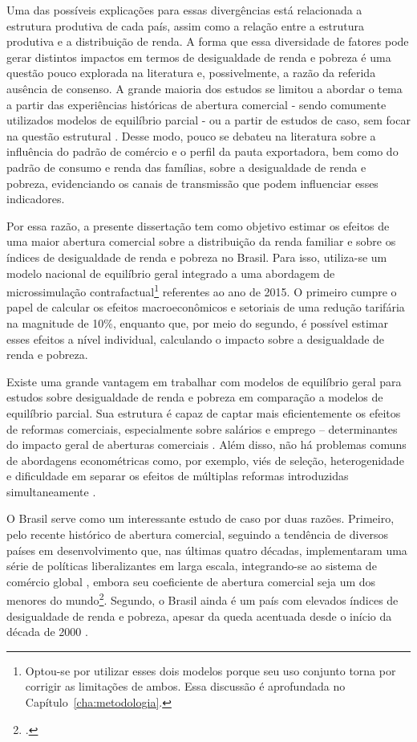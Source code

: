 Uma das possíveis explicações para essas divergências está relacionada a estrutura produtiva de cada país, assim como a relação entre a estrutura produtiva e a distribuição de renda. A forma que essa diversidade de fatores pode gerar distintos impactos em termos de desigualdade de renda e pobreza é uma questão pouco explorada na literatura e, possivelmente, a razão da referida ausência de consenso. A grande maioria dos estudos se limitou a abordar o tema a partir das experiências históricas de abertura comercial - sendo comumente utilizados modelos de equilíbrio parcial \cite{castilho12, bayar17} - ou a partir de estudos de caso, sem focar na questão estrutural \cite{borrazetal12, estrades12, campostimini22}. Desse modo, pouco se debateu na literatura sobre a influência do padrão de comércio e o perfil da pauta exportadora, bem como do padrão de consumo e renda das famílias, sobre a desigualdade de renda e pobreza, evidenciando os canais de transmissão que podem influenciar esses indicadores. 

Por essa razão, a presente dissertação tem como objetivo estimar os efeitos de uma maior abertura comercial sobre a distribuição da renda familiar e sobre os índices de desigualdade de renda e pobreza no Brasil. Para isso, utiliza-se um modelo nacional de equilíbrio geral integrado a uma abordagem de microssimulação contrafactual\footnote{Optou-se por utilizar esses dois modelos porque seu uso conjunto torna por corrigir as limitações de ambos. Essa discussão é aprofundada no Capítulo~\ref{cha:metodologia}.} referentes ao ano de 2015. O primeiro cumpre o papel de calcular os efeitos macroeconômicos e setoriais de uma redução tarifária na magnitude de 10\%, enquanto que, por meio do segundo, é possível estimar esses efeitos a nível individual, calculando o impacto sobre a desigualdade de renda e pobreza.

Existe uma grande vantagem em trabalhar com modelos de equilíbrio geral para estudos sobre desigualdade de renda e pobreza em comparação a modelos de equilíbrio parcial. Sua estrutura é capaz de captar mais eficientemente os efeitos de reformas comerciais, especialmente sobre salários e emprego -- determinantes do impacto geral de aberturas comerciais \cite{naranpanawa11}. Além disso, não há problemas comuns de abordagens econométricas como, por exemplo, viés de seleção, heterogenidade e dificuldade em separar os efeitos de múltiplas reformas introduzidas simultaneamente \cite{anderson20}.

O Brasil serve como um interessante estudo de caso por duas razões. Primeiro, pelo recente histórico de abertura comercial, seguindo a tendência de diversos países em desenvolvimento que, nas últimas quatro décadas, implementaram uma série de políticas liberalizantes em larga escala, integrando-se ao sistema de comércio global \cite{pavcnik17}, embora seu coeficiente de abertura comercial seja um dos menores do mundo\footnote{\textcite{ourworldindata}.}. Segundo, o Brasil ainda é um país com elevados índices de desigualdade de renda e pobreza, apesar da queda acentuada desde o início da década de 2000 \cite{ocde15}.

